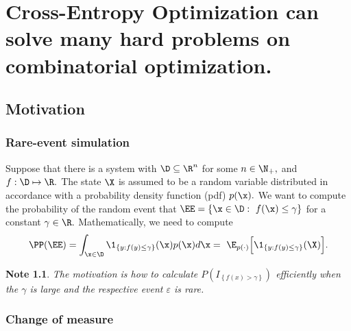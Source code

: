 \newtheorem{ques}{Question}
\newtheorem{answ}{Answer}
\newtheorem{note}{Note}

\chapter{ Cross-Entropy Optimization can solve many hard problems on combinatorial optimization.
}
\section{Motivation}

      \subsection{Rare-event simulation}
           
      Suppose that there is a system with 
       $\D \subseteq \R^n$ for some $n\in \N_+,$ 
      and  $f:\D \mapsto \R.$ The state
      $\X$ is assumed to be a random variable distributed in accordance
       with a probability density function (pdf)
      $p(\x).$ We want to compute the probability of the random event
      that $\EE=\{\x\in \D:\ f(\x)\le \gamma\}$ for a  constant
      $\gamma\in \R.$ Mathematically, we need to compute
      \begin{equation}\label{eq:Objective_RES}
            \PP(\EE)=\int_{\x\in \D} \1_{\{y: f(y) \le \gamma\}}(\x)p(\x) d\x=\ \E_{p(\cdot)} \Big[ \1_{\{y: f(y) \le \gamma\}}(\X) \Big].
      \end{equation}


\begin{note}
      The motivation is how to calculate $ P\left(I_{\left\{f(x) > \gamma\right\}}\right) $ efficiently when
      the $\gamma$ is large and the respective event $\varepsilon$ is rare.
\end{note}

      \subsection{Change of measure}

